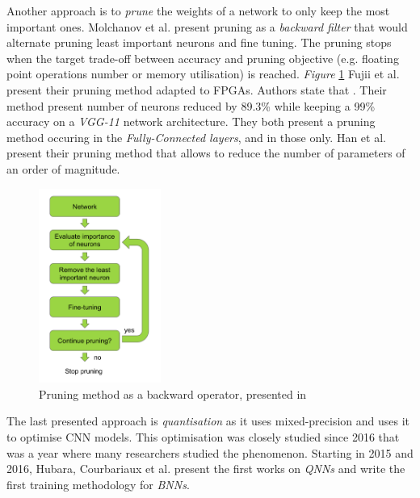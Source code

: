 Another approach is to \emph{prune} the weights of a network to only keep the most important ones. Molchanov et al. \cite{Molchanov2016} present pruning as a \emph{backward filter} that would alternate pruning least important neurons and fine tuning. The pruning stops when the target trade-off between accuracy and pruning objective (e.g. floating point operations number or memory utilisation) is reached. \emph{Figure} \ref{fig:PruningMethod} Fujii et al. \cite{Fujii2017} present their pruning method adapted to FPGAs. Authors state that . Their method present number of neurons reduced by 89.3\% while keeping a 99\% accuracy on a \emph{VGG-11} network architecture. They both present a pruning method occuring in the \emph{Fully-Connected layers}, and in those only. Han et al. \cite{Han2015} present their pruning method that allows to reduce the number of parameters of an order of magnitude.

\begin{figure}[htbp]
	\centering
		\includegraphics[width=4cm]{Figures/PruningMethod.png}
	\caption[Inference Optimisations]{Pruning method as a backward operator, presented in \cite{Molchanov2016}}
	\label{fig:PruningMethod}
\end{figure}

The last presented approach is \emph{quantisation} as it uses mixed-precision and uses it to optimise CNN models. This optimisation was closely studied since 2016 that was a year where many researchers studied the phenomenon. Starting in 2015 and 2016, Hubara, Courbariaux et al. \cite{Hubara2016, Courbariaux2015, Courbariaux2016} present the first works on \emph{QNNs}  and write the first training methodology for \emph{BNNs}.

